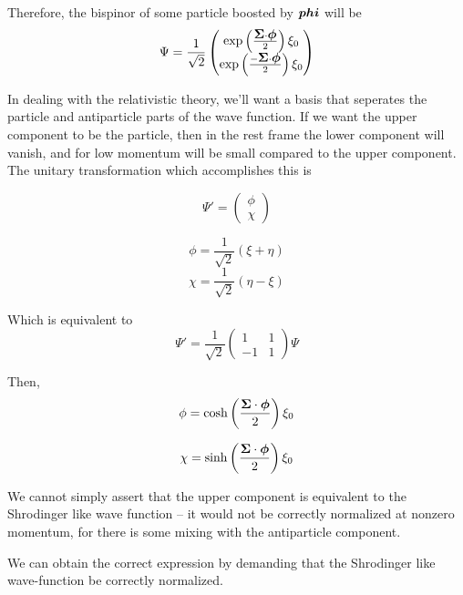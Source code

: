 Therefore, the bispinor of some particle boosted by $\mbox{\boldmath$ phi $}$ will be
\[
\Psi = \frac{1}{\sqrt{2}} \begin{pmatrix} 
		\exp\left( \frac{\mbox{\boldmath$ \Sigma $} \cdot \mbox{\boldmath$ \phi $} }{2} \right)\xi_0 \\ 
		\exp \left( \frac{-\mbox{\boldmath$ \Sigma $} \cdot \mbox{\boldmath$ \phi $} }{2} \right) \xi_0 
	\end{pmatrix}
\]


In dealing with the relativistic theory, we'll want a basis that seperates the particle and antiparticle parts of the wave function.  If we want the upper component to be the particle, then in the rest frame the lower component will vanish, and for low momentum will be small compared to the upper component.  The unitary transformation which accomplishes this is

\[
	\Psi' = \begin{pmatrix} \phi \\ \chi \end{pmatrix}
\]

\[
	\phi = \frac{1}{\sqrt{2}}(\xi + \eta)
\]
\[
	\chi = \frac{1}{\sqrt{2}}( \eta - \xi)
\]

Which is equivalent to
\[
	\Psi' = \frac{1}{\sqrt{2}} \begin{pmatrix}1 & 1 \\ -1 & 1 \end{pmatrix} \Psi
\]

Then,
\[
	\phi =  \cosh \left( \frac{\mbox{\boldmath$ \Sigma $} \cdot \mbox{\boldmath$ \phi $} }{2} \right ) \xi_0
\]

\[
	\chi =  \sinh \left( \frac{\mbox{\boldmath$ \Sigma $} \cdot \mbox{\boldmath$ \phi $} }{2} \right ) \xi_0
\]

We cannot simply assert that the upper component is equivalent to the Shrodinger like wave function -- it would not be correctly normalized at nonzero momentum, for there is some mixing with the antiparticle component.

We can obtain the correct expression by demanding that the Shrodinger like wave-function be correctly normalized.





